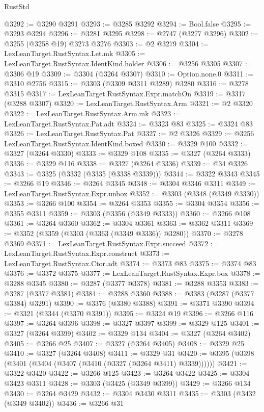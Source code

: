 \begin{lexlean}{RustStd}
\begin{coremodule}
{\begin{coremodule}
{{{{{{{{{{{{{{{{{{{{{{{{{{{{{{{{{@3292 := @3290 @3291
@3293 := @3285 @3292
@3294 := Bool.false
@3295 := @3293 @3294
@3296 := @3281 @3295
@3298 := @2747 (@3277 @3296)
@3302 := @3255 (@3258 @19) @3273 @3276
@3303 := @2 @3279
@3304 := LexLeanTarget.RustSyntax.Let.mk
@3305 := LexLeanTarget.RustSyntax.IdentKind.holder
@3306 := @3256 @3305
@3307 := @3306 @19
@3309 := @3304 (@3264 @3307)
@3310 := Option.none.{0}
@3311 := @3310 @2756
@3315 := @3303 (@3309 @3311 @3289) @3280
@3316 := @3278 @3315
@3317 := LexLeanTarget.RustSyntax.Expr.matchOn
@3319 := @3317 (@3288 @3307)
@3320 := LexLeanTarget.RustSyntax.Arm
@3321 := @2 @3320
@3322 := LexLeanTarget.RustSyntax.Arm.mk
@3323 := LexLeanTarget.RustSyntax.Pat.adt
@3324 := @3323 @83
@3325 := @3324 @83
@3326 := LexLeanTarget.RustSyntax.Pat
@3327 := @2 @3326
@3329 := @3256 LexLeanTarget.RustSyntax.IdentKind.boxed
@3330 := @3329 @100
@3332 := @3327 (@3264 @3330)
@3333 := @3329 @108
@3335 := @3327 (@3264 @3333)
@3336 := @3329 @116
@3338 := @3327 (@3264 @3336)
@3339 := @34 @3326
@3343 := @3325 (@3332 (@3335 (@3338 @3339)))
@3344 := @3322 @3343
@3345 := @3266 @19
@3346 := @3264 @3345
@3348 := @3304 @3346 @3311
@3349 := LexLeanTarget.RustSyntax.Expr.unbox
@3352 := @3303 (@3348 (@3349 @3330))
@3353 := @3266 @100
@3354 := @3264 @3353
@3355 := @3304 @3354
@3356 := @3355 @3311
@3359 := @3303 (@3356 (@3349 @3333))
@3360 := @3266 @108
@3361 := @3264 @3360
@3362 := @3304 @3361
@3363 := @3362 @3311
@3369 := @3352 (@3359 (@3303 (@3363 (@3349 @3336)) @3280))
@3370 := @3278 @3369
@3371 := LexLeanTarget.RustSyntax.Expr.succeed
@3372 := LexLeanTarget.RustSyntax.Expr.construct
@3373 := LexLeanTarget.RustSyntax.Ctor.adt
@3374 := @3373 @83
@3375 := @3374 @83
@3376 := @3372 @3375
@3377 := LexLeanTarget.RustSyntax.Expr.box
@3378 := @3288 @3345
@3380 := @3287 (@3377 @3378)
@3381 := @3288 @3353
@3383 := @3287 (@3377 @3381)
@3384 := @3288 @3360
@3388 := @3383 (@3287 (@3377 @3384) @3291)
@3390 := @3376 (@3380 @3388)
@3391 := @3371 @3390
@3394 := @3321 (@3344 (@3370 @3391))
@3395 := @3324 @19
@3396 := @3266 @116
@3397 := @3264 @3396
@3398 := @3327 @3397
@3399 := @3329 @125
@3401 := @3327 (@3264 @3399)
@3402 := @3329 @134
@3404 := @3327 (@3264 @3402)
@3405 := @3266 @25
@3407 := @3327 (@3264 @3405)
@3408 := @3329 @25
@3410 := @3327 (@3264 @3408)
@3411 := @3329 @31
@3420 := @3395 (@3398 (@3401 (@3404 (@3407 (@3410 (@3327 (@3264 @3411) @3339))))))
@3421 := @3322 @3420
@3422 := @3266 @125
@3423 := @3264 @3422
@3425 := @3304 @3423 @3311
@3428 := @3303 (@3425 (@3349 @3399))
@3429 := @3266 @134
@3430 := @3264 @3429
@3432 := @3304 @3430 @3311
@3435 := @3303 (@3432 (@3349 @3402))
@3436 := @3266 @31
}}}}}}}}}}}}}}}}}}}}}}}}}}}}}}}}}
\end{coremodule}}
\end{coremodule}
\end{lexlean}

